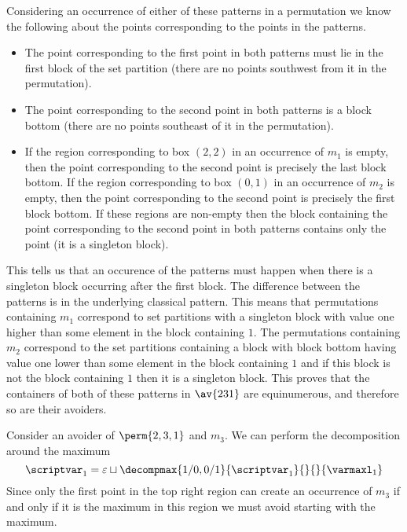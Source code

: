 Considering an occurrence of either of these patterns in a permutation  we know
the following about the points corresponding to the points in the patterns.
\begin{itemize}
    \item The point corresponding to the first point in both patterns
        must lie in the first block of the set partition (there are
        no points southwest from it in the permutation).
    \item The point corresponding to the second point in both patterns
        is a block bottom (there are no points southeast of it in
        the permutation).
    \item If the region corresponding to box \((2,2)\) in an occurrence of
    \(m_1\) is empty, then the point corresponding to the second point is
    precisely the last block bottom. If the region corresponding to box \((0,1)\)
    in an occurrence of \(m_2\) is empty, then the point corresponding to the
    second point is precisely the first block bottom.
    If these regions are non-empty then the block containing the point
    corresponding to the second point in both patterns contains only the point
    (it is a singleton block).
\end{itemize}
This tells us that an occurence of the patterns must happen when there
is a singleton block occurring after the first block. The difference
between the patterns is in the underlying classical pattern. This
means that permutations containing \(m_1\) correspond to set partitions
with a singleton block with value one higher than some element in the
block containing \(1\). The permutations containing \(m_2\) correspond
to the set partitions containing a block with block bottom having value
one lower than some element in the block containing \(1\) and if this
block is not the block containing \(1\) then it is a singleton block. This
proves that the containers of both of these patterns in \(\av{231}\) are
equinumerous, and therefore so are their avoiders.

Consider an avoider of \(\perm{2,3,1}\) and \(m_3\). We can perform
the decomposition around the maximum
\begin{equation*}
    \scriptvar_1 = \varepsilon \sqcup
    \decompmax{1/0,0/1}{\scriptvar_1}{}{}{\mathcal{\varmaxl}_1}
\end{equation*}
Since only the first point in the top right region can
create an occurrence of \(m_3\) if and only if it is the
maximum in this region we must avoid starting with the maximum.

